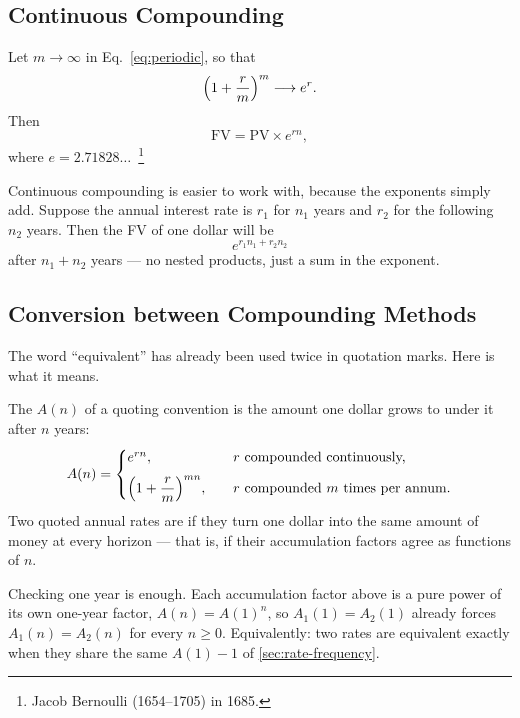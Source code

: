 \subsection{Continuous Compounding}


Let $m \to \infty$ in Eq.~\eqref{eq:periodic}, so that
\[
	\Bigl(1+\frac{r}{m}\Bigr)^{m} \longrightarrow e^{r} .
\]
Then
\begin{equation}
	\mathrm{FV} = \mathrm{PV} \times e^{rn}, \label{eq:continuous}
\end{equation}
where $e = 2.71828\ldots$\ \footnote{Jacob Bernoulli (1654--1705) in 1685.}

Continuous compounding is easier to work with, because the exponents simply add.
Suppose the annual interest rate is $r_{1}$ for $n_{1}$ years and $r_{2}$ for the following $n_{2}$ years.
Then the FV of one dollar will be
\[
	e^{r_{1}n_{1} + r_{2}n_{2}}
\]
after $n_{1}+n_{2}$ years --- no nested products, just a sum in the exponent.

\subsection{Conversion between Compounding Methods}


\suppstart
The word ``equivalent'' has already been used twice in quotation marks. Here is what it means.

\begin{definition}
	\label{def:equivalent-rates}
	The  $A(n)$ of a quoting convention is the amount one dollar grows to under it after $n$ years:
	\[
		A(n) = \begin{cases}
			e^{rn},                                   & r \text{ compounded continuously,}       \\[6pt]
			\Bigl(1+\dfrac{r}{m}\Bigr)^{mn}, \quad & r \text{ compounded $m$ times per annum.}
		\end{cases}
	\]
	Two quoted annual rates are  if they turn one dollar into the same amount of money at every horizon --- that is, if their accumulation factors agree as functions of $n$.
\end{definition}

\begin{note}
	Checking one year is enough.
	Each accumulation factor above is a pure power of its own one-year factor, $A(n)=A(1)^{n}$, so $A_{1}(1)=A_{2}(1)$ already forces $A_{1}(n)=A_{2}(n)$ for every $n\ge 0$.
	Equivalently: two rates are equivalent exactly when they share the same  $A(1)-1$ of \autoref{sec:rate-frequency}.
\end{note}
\suppend

